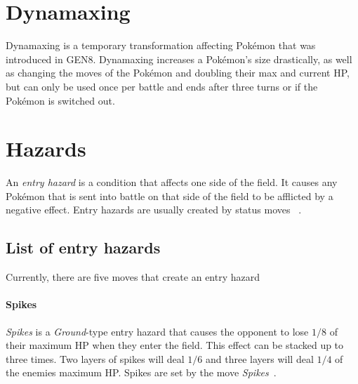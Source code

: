 \section{Dynamaxing}
\label{sec:dynamax}
Dynamaxing is a temporary transformation affecting Pokémon that was introduced in \ac{GEN8}. Dynamaxing increases
a Pokémon's size drastically, as well as changing the moves of the Pokémon and doubling their max and current \ac{HP},
but can only be used once per battle and ends after three turns or if the Pokémon is switched out.

\section{Hazards}
\label{sec:hazards}
An \textit{entry hazard} is a condition that affects one side of the field. It causes
any Pokémon that is sent into battle on that side of the field to be afflicted by 
a negative effect. Entry hazards are usually created by status moves
~\autocite{Bulbapedia:EntryHazards}. 
\subsection{List of entry hazards}
Currently, there are five moves that create an entry hazard

\paragraph{Spikes}
\textit{Spikes} is a \textit{Ground}-type entry hazard that causes the opponent
to lose $1/8$ of their maximum \ac{HP} when they enter the field. This
effect can be stacked up to three times. Two layers of spikes will deal
$1/6$ and three layers will deal $1/4$ of the enemies maximum \ac{HP}.
Spikes are set by the move \textit{Spikes}~\autocite{Bulbapedia:Spikes}.

